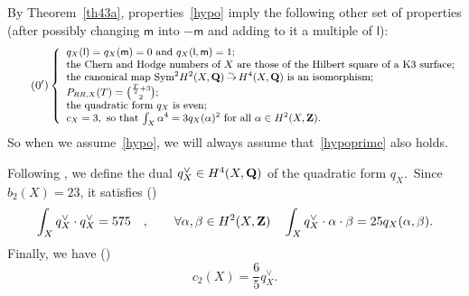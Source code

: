 \documentclass[12pt]{amsart}
\def\Z{{\bf Z}}
\def\Q{{\bf Q}}
\DeclareMathOperator{\Sym}{Sym}
\DeclareMathOperator{\isomto}{\stackrel{{}_{\scriptstyle\sim}}{\to}}
\theoremstyle{remark}
\def\lll{\ensuremath{\mathsf l}}
\def\mm{\ensuremath{\mathsf m}}
\begin{document}
By Theorem~\ref{th43a}, properties~\eqref{hypo} imply the following other set of properties (after possibly changing $\mm$ into $-\mm$ and adding to it a multiple of $\lll$):
\begin{equation}\tag{\theequation$^\prime$}\label{hypoprime}
\begin{small}    \left\{
    \begin{array}{l}
   q_X(\lll)=q_X(\mm)=0\hbox{ and } q_X(\lll,\mm)=1; \\
   \hbox{the Chern and Hodge numbers of $X$ are those of the Hilbert square of a K3 surface;}\\
    \hbox{the canonical map $\Sym^2\!H^2(X,\Q)\isomto H^4(X,\Q)$ is an isomorphism;}\\
    P_{RR,X}(T)= \binom{ \frac{T}{2}+3}{2};\\
    \hbox{the quadratic form $q_X$ is even};\\
c_X =3, \hbox{ so that $\int_X\alpha^4=3q_X(\alpha)^2$ for all } \alpha\in H^2(X,\Z).
    \end{array}
    \right.
\end{small}
\end{equation}
So when we assume~\eqref{hypo}, we will always assume that~\eqref{hypoprime} also holds.


Following \cite[Section~3]{og1}, we define the dual $q_X^\vee \in H^4(X,\Q)$ of the quadratic form $q_X$.\
Since $b_2(X)=23$, it satisfies (\cite[Proposition~2.2]{og1})
\begin{equation}\label{qxc}
\int_X q_X^\vee\cdot q_X^\vee=575\quad,\qquad \forall \alpha,\beta\in H^2(X,\Z)\quad \int_X q_X^\vee\cdot\alpha\cdot\beta=25 q_X(\alpha,\beta).
\end{equation}
Finally, we have (\cite[(3.0.45)]{og1})
\begin{equation}\label{c2}
c_2(X)=\frac 65 q_X^\vee.
\end{equation}
\end{document}
